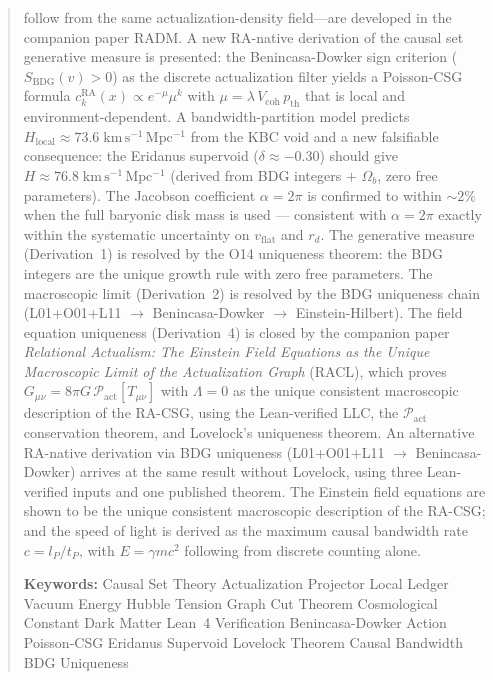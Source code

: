 \documentclass[11pt,a4paper]{article}
\theoremstyle{plain}
\theoremstyle{definition}
\theoremstyle{remark}
\begin{document}
\begin{titlepage}
\begin{abstract}
follow from the same actualization-density field---are developed in the companion
paper RADM. A new RA-native derivation of the
causal set generative measure is presented: the Benincasa-Dowker sign
criterion ($S_{\mathrm{BDG}}(v) > 0$) as the discrete actualization
filter yields a Poisson-CSG formula $c_k^{\mathrm{RA}}(x) \propto
e^{-\mu}\mu^k$ with $\mu = \lambda\,V_{\mathrm{coh}}\,p_{\mathrm{th}}$
that is local and environment-dependent. A bandwidth-partition model
predicts $H_{\mathrm{local}} \approx 73.6\;\mathrm{km\,s^{-1}\,Mpc^{-1}}$
from the KBC void and a new falsifiable consequence: the Eridanus
supervoid ($\delta \approx -0.30$) should give $H \approx
76.8\;\mathrm{km\,s^{-1}\,Mpc^{-1}}$ (derived from BDG integers $+$ $\Omega_b$, zero free parameters). The Jacobson coefficient
$\alpha = 2\pi$ is confirmed to within ${\sim}2\%$ when the full
baryonic disk mass is used --- consistent
with $\alpha = 2\pi$ exactly within the systematic uncertainty on
$v_{\mathrm{flat}}$ and $r_d$. The generative measure (Derivation~1)
is resolved by the O14 uniqueness theorem: the BDG integers are the
unique growth rule with zero free parameters. The macroscopic limit
(Derivation~2) is resolved by the BDG uniqueness chain
(L01+O01+L11 $\to$ Benincasa-Dowker $\to$ Einstein-Hilbert).
The field equation uniqueness (Derivation~4) is
closed by the companion paper \emph{Relational Actualism: The Einstein Field
Equations as the Unique Macroscopic Limit of the Actualization Graph}
(RACL), which proves $G_{\mu\nu} = 8\pi G\,
\mathcal{P}_{\mathrm{act}}[T_{\mu\nu}]$ with $\Lambda = 0$ as the unique
consistent macroscopic description of the RA-CSG, using the Lean-verified
LLC, the $\mathcal{P}_{\mathrm{act}}$ conservation theorem, and Lovelock's
uniqueness theorem.
An alternative RA-native derivation via BDG uniqueness
(L01+O01+L11 $\to$ Benincasa-Dowker) arrives at the same result without
Lovelock, using three Lean-verified inputs and one published theorem.
The Einstein field equations are shown to be the unique consistent
macroscopic description of the RA-CSG; and the speed
of light is derived as the maximum causal bandwidth rate $c = l_P/t_P$,
with $E = \gamma mc^2$ following from discrete counting alone.

\medskip\noindent
\textbf{Keywords:} Causal Set Theory \textperiodcentered{} Actualization Projector
\textperiodcentered{} Local Ledger \textperiodcentered{} Vacuum Energy
\textperiodcentered{} Hubble Tension \textperiodcentered{} Graph Cut Theorem
\textperiodcentered{} Cosmological Constant \textperiodcentered{} Dark Matter \textperiodcentered{} Lean~4 Verification \textperiodcentered{} Benincasa-Dowker Action \textperiodcentered{} Poisson-CSG \textperiodcentered{} Eridanus Supervoid \textperiodcentered{} Lovelock Theorem \textperiodcentered{} Causal Bandwidth \textperiodcentered{} BDG Uniqueness
\end{abstract}
\end{titlepage}
\end{document}

